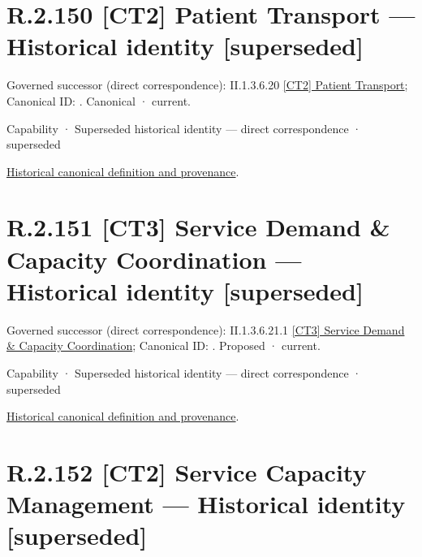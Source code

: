 \section*{R.2.150 [CT2] Patient Transport — Historical identity [superseded]}
\label{navigation:R.2.150}

{\small Governed successor (direct correspondence): II.1.3.6.20 \hyperref[element:6041d7c0cc5d4519aaea584bb4e6d365]{[CT2] Patient Transport}; Canonical ID: \texttt{}. Canonical · current.}\par
\label{element:e9c1a897884f4d758f5654b824364030}
{\small Capability · Superseded historical identity — direct correspondence · superseded}\par
\href{../../../../continuum/strategy/capability/e9c1a897884f4d758f5654b824364030.md}{Historical canonical definition and provenance}.\par
\section*{R.2.151 [CT3] Service Demand \& Capacity Coordination — Historical identity [superseded]}
\label{navigation:R.2.151}

{\small Governed successor (direct correspondence): II.1.3.6.21.1 \hyperref[element:93b5548ce8d04fcd999b97536c1eebf9]{[CT3] Service Demand \& Capacity Coordination}; Canonical ID: \texttt{}. Proposed · current.}\par
\label{element:b57081e650f74ad488549fdaa5305bcb}
{\small Capability · Superseded historical identity — direct correspondence · superseded}\par
\href{../../../../continuum/strategy/capability/b57081e650f74ad488549fdaa5305bcb.md}{Historical canonical definition and provenance}.\par
\section*{R.2.152 [CT2] Service Capacity Management — Historical identity [superseded]}
\label{navigation:R.2.152}

